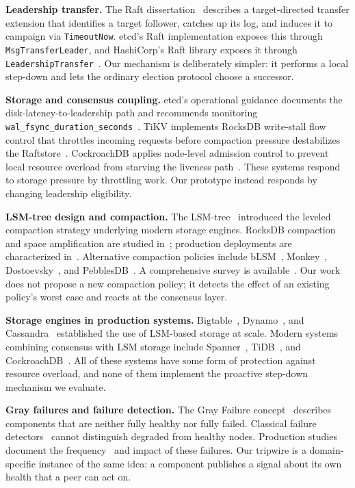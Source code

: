 \documentclass[conference, a4paper]{IEEEtran}
\begin{document}
\textbf{Leadership transfer.} The Raft dissertation~\cite{raft_dissertation}
describes a target-directed transfer extension that identifies a target
follower, catches up its log, and induces it to campaign via
\texttt{TimeoutNow}. etcd's Raft implementation exposes this through
\texttt{MsgTransferLeader}, and HashiCorp's Raft library exposes it
through \texttt{LeadershipTransfer}~\cite{hashicorp_raft}. Our mechanism
is deliberately simpler: it performs a local step-down and lets the
ordinary election protocol choose a successor.

\textbf{Storage and consensus coupling.} etcd's operational guidance
documents the disk-latency-to-leadership path and recommends monitoring
\texttt{wal\_fsync\_duration\_seconds}~\cite{etcd_docs}. TiKV implements
RocksDB write-stall flow control that throttles incoming requests
before compaction pressure destabilizes the
Raftstore~\cite{tikv_docs}. CockroachDB applies node-level admission
control to prevent local resource overload from starving the liveness
path~\cite{cockroachdb_taft}. These systems respond to storage pressure
by throttling work. Our prototype instead responds by changing
leadership eligibility.

\textbf{LSM-tree design and compaction.} The LSM-tree~\cite{lsm}
introduced the leveled compaction strategy underlying modern storage
engines. RocksDB compaction and space amplification are studied
in~\cite{dong_rocksdb}; production deployments are characterized
in~\cite{matsunobu_myrocks,cao_rocksdb_workload}. Alternative compaction
policies include bLSM~\cite{sears_blsm}, Monkey~\cite{dayan_monkey},
Dostoevsky~\cite{dayan_dostoevsky}, and
PebblesDB~\cite{raju_pebblesdb}. A comprehensive
survey is available~\cite{luo_lsm_survey}. Our work does not propose a
new compaction policy; it detects the effect of an existing policy's
worst case and reacts at the consensus layer.

\textbf{Storage engines in production systems.} Bigtable~\cite{chang_bigtable},
Dynamo~\cite{decandia_dynamo}, and
Cassandra~\cite{lakshman_cassandra} established the use of LSM-based
storage at scale. Modern systems combining consensus with LSM storage
include Spanner~\cite{corbett_spanner}, TiDB~\cite{huang_tidb}, and
CockroachDB~\cite{cockroachdb_taft}. All of these systems have some form
of protection against resource overload, and none of them implement the
proactive step-down mechanism we evaluate.

\textbf{Gray failures and failure detection.} The Gray Failure
concept~\cite{gray_failures} describes components that are neither fully
healthy nor fully failed. Classical failure
detectors~\cite{chandra_toueg,das_phi} cannot distinguish degraded from
healthy nodes. Production studies document the
frequency~\cite{gunawi_bugs,gunawi_stop,alquraan_partition} and impact
of these failures. Our tripwire is a domain-specific instance of the
same idea: a component publishes a signal about its own health that a
peer can act on.
\end{document}
